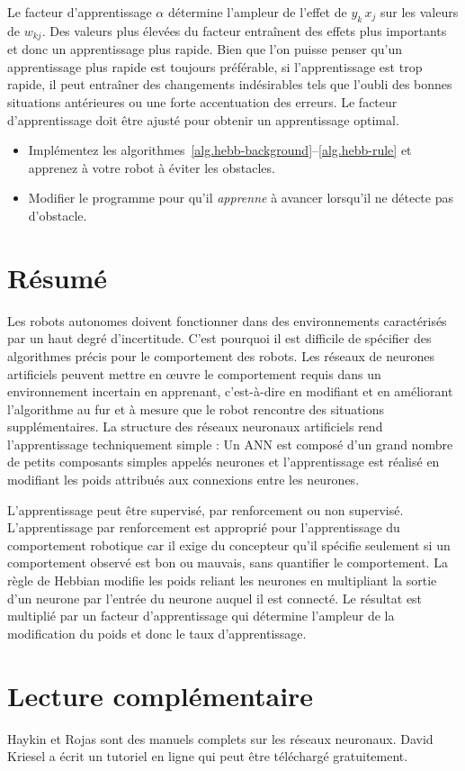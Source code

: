 Le facteur d'apprentissage $\alpha$ détermine l'ampleur de l'effet de $y_k\, x_j$ sur les valeurs de $w_{kj}$. Des valeurs plus élevées du facteur entraînent des effets plus importants et donc un apprentissage plus rapide. Bien que l'on puisse penser qu'un apprentissage plus rapide est toujours préférable, si l'apprentissage est trop rapide, il peut entraîner des changements indésirables tels que l'oubli des bonnes situations antérieures ou une forte accentuation des erreurs. Le facteur d'apprentissage doit être ajusté pour obtenir un apprentissage optimal.

\begin{framed}
\begin{itemize}
\item Implémentez les algorithmes~\ref{alg.hebb-background}--\ref{alg.hebb-rule} et apprenez à votre robot à éviter les obstacles.
\item Modifier le programme pour qu'il \emph{apprenne} à avancer lorsqu'il ne détecte pas d'obstacle.
\end{itemize}
\end{framed}

\section{Résumé}

Les robots autonomes doivent fonctionner dans des environnements caractérisés par un haut degré d'incertitude. C'est pourquoi il est difficile de spécifier des algorithmes précis pour le comportement des robots. Les réseaux de neurones artificiels peuvent mettre en œuvre le comportement requis dans un environnement incertain en apprenant, c'est-à-dire en modifiant et en améliorant l'algorithme au fur et à mesure que le robot rencontre des situations supplémentaires. La structure des réseaux neuronaux artificiels rend l'apprentissage techniquement simple : Un ANN est composé d'un grand nombre de petits composants simples appelés neurones et l'apprentissage est réalisé en modifiant les poids attribués aux connexions entre les neurones.

L'apprentissage peut être supervisé, par renforcement ou non supervisé. L'apprentissage par renforcement est approprié pour l'apprentissage du comportement robotique car il exige du concepteur qu'il spécifie seulement si un comportement observé est bon ou mauvais, sans quantifier le comportement. La règle de Hebbian modifie les poids reliant les neurones en multipliant la sortie d'un neurone par l'entrée du neurone auquel il est connecté. Le résultat est multiplié par un facteur d'apprentissage qui détermine l'ampleur de la modification du poids et donc le taux d'apprentissage.

\section{Lecture complémentaire}

Haykin \cite{haykin} et Rojas \cite{rojas} sont des manuels complets sur les réseaux neuronaux. David Kriesel a écrit un tutoriel en ligne \cite{kriesel} qui peut être téléchargé gratuitement.
